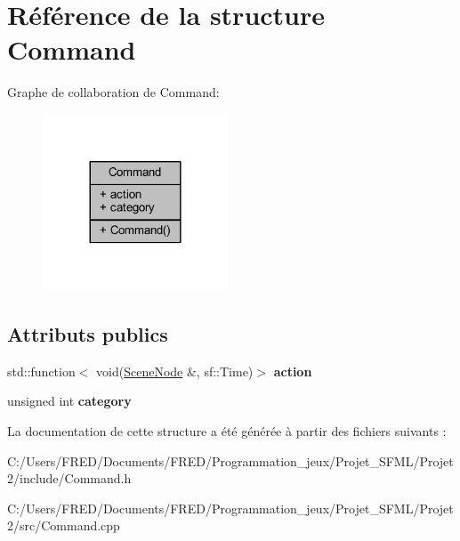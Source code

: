 \hypertarget{struct_command}{}\section{Référence de la structure Command}
\label{struct_command}


Graphe de collaboration de Command\+:\nopagebreak
\begin{figure}[H]
\begin{center}
\leavevmode
\includegraphics[width=156pt]{struct_command__coll__graph}
\end{center}
\end{figure}
\subsection*{Attributs publics}
\begin{DoxyCompactItemize}
\item 
std\+::function$<$ void(\hyperlink{class_scene_node}{Scene\+Node} \&, sf\+::\+Time)$>$ {\bfseries action}\hypertarget{struct_command_a104fe6a9eb7bc8fc2f23acc67eb2b1d9}{}\label{struct_command_a104fe6a9eb7bc8fc2f23acc67eb2b1d9}

\item 
unsigned int {\bfseries category}\hypertarget{struct_command_a1529e898c9e6dd47b1826b5b1eac09fb}{}\label{struct_command_a1529e898c9e6dd47b1826b5b1eac09fb}

\end{DoxyCompactItemize}


La documentation de cette structure a été générée à partir des fichiers suivants \+:\begin{DoxyCompactItemize}
\item 
C\+:/\+Users/\+F\+R\+E\+D/\+Documents/\+F\+R\+E\+D/\+Programmation\+\_\+jeux/\+Projet\+\_\+\+S\+F\+M\+L/\+Projet2/include/Command.\+h\item 
C\+:/\+Users/\+F\+R\+E\+D/\+Documents/\+F\+R\+E\+D/\+Programmation\+\_\+jeux/\+Projet\+\_\+\+S\+F\+M\+L/\+Projet2/src/Command.\+cpp\end{DoxyCompactItemize}
